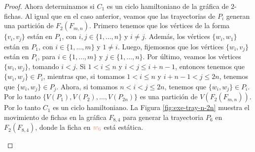 \begin{proof}
    Ahora determinamos si $C_1$ es un ciclo hamiltoniano de la gr\'afica de
    $2$-fichas. Al igual que en el caso anterior, veamos que las trayectorias de
    $P_i$ generan una partici\'on de $F_2(F_{m,n})$. Primero tenemos que los
    v\'ertices de la forma $\{v_i,v_j\}$ est\'an en $P_1$, con $i,j \in \{1,
    \dots, n\}$ y $i \neq j$. Adem\'as, los v\'ertices $\{w_i,w_1\}$
    est\'an en $P_1$, con $i \in \{1, \dots, m\}$ y $1 \neq i$. Luego,
    fijemosnos que los v\'ertices $\{w_i,v_j\}$ est\'an en $P_i$, para $i\in
    \{1, \dots, m\}$ y $j \in \{1, \dots, n\}$. Por \'ultimo, veamos los
    v\'ertices $\{w_i,w_j\}$, tomando $i < j$. Si $1 < i \leq n$ y $i <
    j \leq i+n-1$, entonces tenemos que $\{w_i,w_j\} \in P_i$, mientras que, si
    tomamos $1 < i \leq n$ y $i+n-1 < j \leq 2n$, tenemos que $\{w_i,w_j\} \in
    P_j$. Ahora, si tomamos $n<i<j \leq 2n$, tenemos que $\{w_i,w_j\} \in P_i$.
    Por lo tanto $\{V(P_1),V(P_2), \dots, V(P_{2n})\}$ es una partici\'on de
    $V(F_2(F_{m,n}))$. Por lo tanto $C_1$ es un ciclo hamiltoniano. La Figura
    \ref{fig:exe-tray-n-2n} muestra el movimiento de fichas en la gr\'afica
    $F_{8,4}$ para generar la trayectoria $P_6$ en $F_2(F_{8,4})$, donde la
    ficha en ${\color{coral}w_6}$ est\'a est\'atica.


    \begin{figure}[ht!]
        \centering
\end{figure}
\end{proof}

